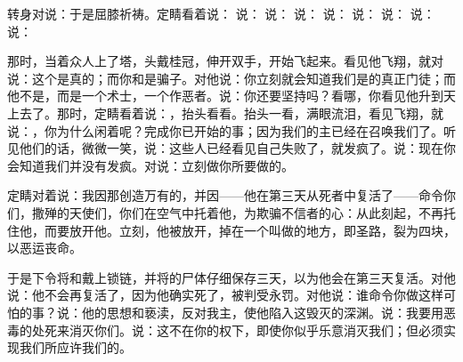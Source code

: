 转身对说：于是屈膝祈祷。定睛看着说： 说： 说： 说： 说： 说： 说： 说： 说：\par

那时，当着众人上了塔，头戴桂冠，伸开双手，开始飞起来。看见他飞翔，就对说：这个是真的；而你和是骗子。对他说：你立刻就会知道我们是的真正门徒；而他不是，而是一个术士，一个作恶者。说：你还要坚持吗？看哪，你看见他升到天上去了。那时，定睛看着说：，抬头看看。抬头一看，满眼流泪，看见飞翔，就说：，你为什么闲着呢？完成你已开始的事；因为我们的主已经在召唤我们了。听见他们的话，微微一笑，说：这些人已经看见自己失败了，就发疯了。说：现在你会知道我们并没有发疯。对说：立刻做你所要做的。\par

定睛对着说：我因那创造万有的，并因——他在第三天从死者中复活了——命令你们，撒殚的天使们，你们在空气中托着他，为欺骗不信者的心：从此刻起，不再托住他，而要放开他。立刻，他被放开，掉在一个叫做的地方，即圣路，裂为四块，以恶运丧命。\par

于是下令将和戴上锁链，并将的尸体仔细保存三天，以为他会在第三天复活。对他说：他不会再复活了，因为他确实死了，被判受永罚。对他说：谁命令你做这样可怕的事？说：他的思想和亵渎，反对我主，使他陷入这毁灭的深渊。说：我要用恶毒的处死来消灭你们。说：这不在你的权下，即使你似乎乐意消灭我们；但必须实现我们所应许我们的。\par

